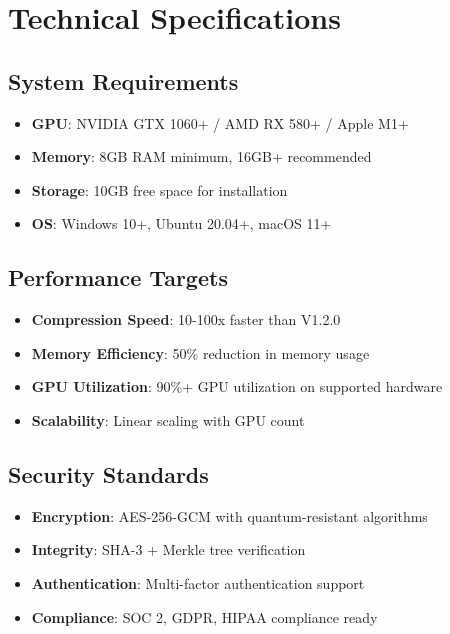 \documentclass[12pt,a4paper]{article}
\begin{document}
\section{Technical Specifications}

\subsection{System Requirements}
\begin{itemize}
    \item \textbf{GPU}: NVIDIA GTX 1060+ / AMD RX 580+ / Apple M1+
    \item \textbf{Memory}: 8GB RAM minimum, 16GB+ recommended
    \item \textbf{Storage}: 10GB free space for installation
    \item \textbf{OS}: Windows 10+, Ubuntu 20.04+, macOS 11+
\end{itemize}

\subsection{Performance Targets}
\begin{itemize}
    \item \textbf{Compression Speed}: 10-100x faster than V1.2.0
    \item \textbf{Memory Efficiency}: 50\% reduction in memory usage
    \item \textbf{GPU Utilization}: 90\%+ GPU utilization on supported hardware
    \item \textbf{Scalability}: Linear scaling with GPU count
\end{itemize}

\subsection{Security Standards}
\begin{itemize}
    \item \textbf{Encryption}: AES-256-GCM with quantum-resistant algorithms
    \item \textbf{Integrity}: SHA-3 + Merkle tree verification
    \item \textbf{Authentication}: Multi-factor authentication support
    \item \textbf{Compliance}: SOC 2, GDPR, HIPAA compliance ready
\end{itemize}

\end{document}
